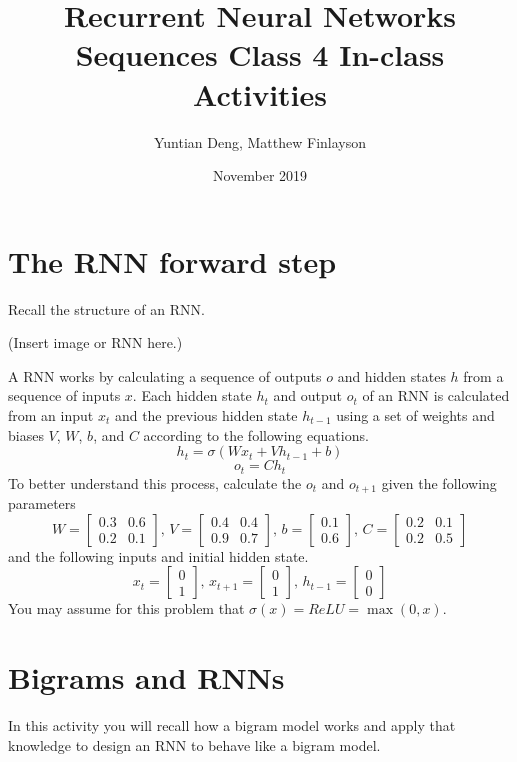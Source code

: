 \documentclass{article}
\title{Recurrent Neural Networks \\
\large Sequences Class 4 In-class Activities}
\author{Yuntian Deng, Matthew Finlayson}
\date{November 2019}
\begin{document}
\maketitle

\section{The RNN forward step}
Recall the structure of an RNN.

(Insert image or RNN here.)

A RNN works by calculating a sequence of outputs $o$ and hidden states $h$ from a sequence of inputs $x$. Each hidden state $h_t$ and output $o_t$ of an RNN is calculated from an input $x_{t}$ and the previous hidden state $h_{t - 1}$ using a set of weights and biases $V$, $W$, $b$, and $C$ according to the following equations.
$$ h_t = \sigma(Wx_t + Vh_{t - 1} + b) $$
$$ o_t = Ch_t $$
To better understand this process, calculate the $o_t$ and $o_{t + 1}$ given the following parameters
$$W = \begin{bmatrix} 0.3 & 0.6 \\ 0.2  & 0.1 \end{bmatrix},\, V = \begin{bmatrix}0.4 & 0.4 \\ 0.9  & 0.7 \end{bmatrix},\, b = \begin{bmatrix} 0.1 \\ 0.6 \end{bmatrix},\, C = \begin{bmatrix} 0.2 & 0.1 \\ 0.2  & 0.5 \end{bmatrix}$$
and the following inputs and initial hidden state.
$$x_t = \begin{bmatrix} 0 \\ 1 \end{bmatrix},\, x_{t + 1} = \begin{bmatrix} 0 \\ 1 \end{bmatrix},\, h_{t - 1} = \begin{bmatrix} 0 \\ 0 \end{bmatrix}$$
You may assume for this problem that $\sigma(x) = ReLU = \max(0, x)$.

\section{Bigrams and RNNs}
In this activity you will recall how a bigram model works and apply that knowledge to design an RNN to behave like a bigram model.
\end{document}
